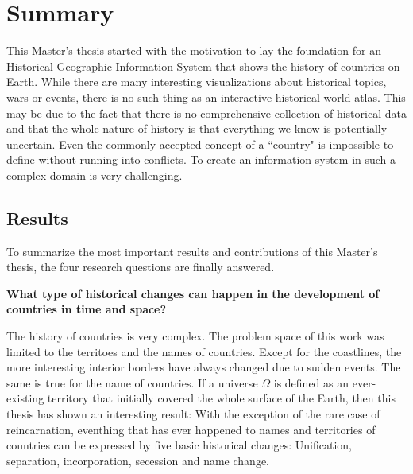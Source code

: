 
\chapter{Summary} %
\label{cha:summary}


This Master's thesis started with the motivation to lay the foundation for an Historical Geographic Information System that shows the history of countries on Earth. While there are many interesting visualizations about historical topics, wars or events, there is no such thing as an interactive historical world atlas. This may be due to the fact that there is no comprehensive collection of historical data and that the whole nature of history is that everything we know is potentially uncertain. Even the commonly accepted concept of a ``country" is impossible to define without running into conflicts. To create an information system in such a complex domain is very challenging.


\section{Results} %
\label{sec:results}

To summarize the most important results and contributions of this Master's thesis, the four research questions are finally answered.

\begin{description}[labelindent=0.55em]
  \item[\textbf{1)}]
  \textbf{
    What type of historical changes can happen in the development of countries in time and space?
  }
\end{description}

The history of countries is very complex. The problem space of this work was limited to the territoes and the names of countries. Except for the coastlines, the more interesting interior borders have always changed due to sudden events. The same is true for the name of countries. If a universe $\Omega$ is defined as an ever-existing territory that initially covered the whole surface of the Earth, then this thesis has shown an interesting result: With the exception of the rare case of reincarnation, eventhing that has ever happened to names and territories of countries can be expressed by five basic historical changes: Unification, separation, incorporation, secession and name change.

